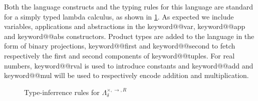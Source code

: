 \documentclass[11pt, final]{article}
\makeatletter
\def\<#1>{\csname keyword@@#1\endcsname}
\makeatother
\begin{document}
  Both the language constructs and the typing rules for this language are standard for a simply typed lambda calculus, as shown in \ref{fig:base_infer}.
  As expected we include variables, applications and abstractions in the \<var>, \<app> and \<abs> constructors.
  Product types are added to the language in the form of binary projections, \<first> and \<second> to fetch respectively the first and second components of \<tuple>s.
  For real numbers, \<rval> is used to introduce constants and \<add> and \<mul> will be used to respectively encode addition and multiplication.

  \begin{figure}
    \caption{Type-inferrence rules for $\Lambda_{\delta}^{\times, \rightarrow, R}$}
    \label{fig:base_infer}
  \end{figure}
\end{document}
